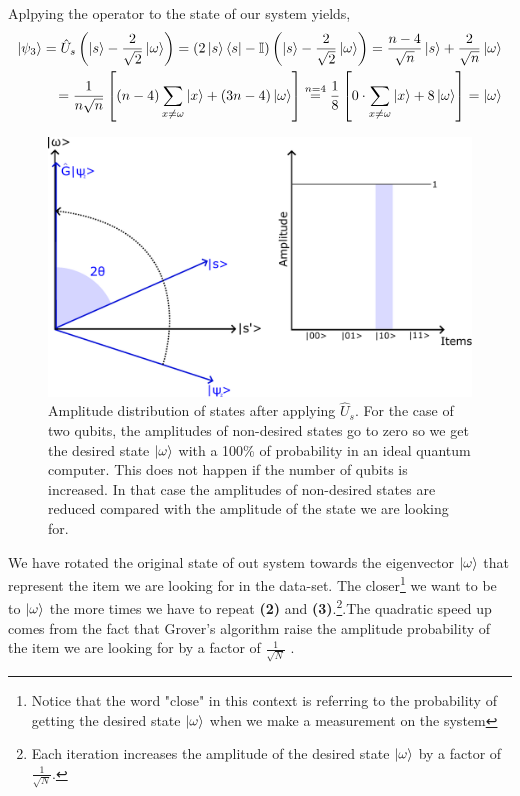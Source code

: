 Aplpying the operator to the state of our system yields,
\begin{align*}
    \ket{\psi_{3}} = \hat{U}_{s}\left(\ket{s} -\frac{2}{\sqrt{2}}\ket{\omega}\right) = \left(2\ket{s}\bra{s} - \mathbb{I}\right)\left(\ket{s} - \frac{2}{\sqrt{2}}\ket{\omega}\right) = \frac{n - 4}{\sqrt{n}}\ket{s} + \frac{2}{\sqrt{n}}\ket{\omega} \\
    = \frac{1}{n\sqrt{n}} \left[\left(n - 4\right)\sum_{x\neq \omega}\ket{x} + \left(3n-4\right)\ket{\omega}\right] \overset{n=4}{=} \frac{1}{8} \left[0 \cdot \sum_{x\neq \omega}\ket{x} + 8\ket{\omega}\right] = \ket{\omega}
\end{align*}
\begin{figure}[H]
    \centering
    \includegraphics[scale=0.55]{Figures/Grover_Step3.pdf}
    \caption{Amplitude distribution of states after applying $\hat{U}_{s}$. For the case of two qubits, the amplitudes of non-desired states go to zero so we get the desired state $\ket{\omega}$ with a 100\% of probability in an ideal quantum computer. This does not happen if the number of qubits is increased. In that case the amplitudes of non-desired states are reduced compared with the amplitude of the state we are looking for.}
    \label{fig:Grover_step3}
\end{figure}
\begin{flushleft}
   We have rotated the original state of out system towards the eigenvector $\ket{\omega}$ that represent the item we are looking for in the data-set. The closer\footnote{Notice that the word "close" in this context is referring to the probability of getting the desired state $\ket{\omega}$ when we make a measurement on the system} we want to be to $\ket{\omega}$ the more times we have to repeat \textbf{(2)} and \textbf{(3)}.\footnote{Each iteration increases the amplitude of the desired state $\ket{\omega}$ by a factor of $\frac{1}{\sqrt{N}}$.}.The quadratic speed up comes from the fact that Grover's algorithm raise the amplitude probability of the item we are looking for by a factor of $\frac{1}{\sqrt{N}}$ .
\end{flushleft}


